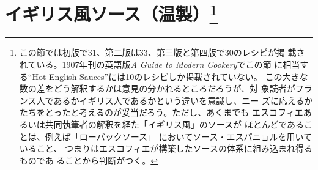 \hypertarget{ux30a4ux30aeux30eaux30b9ux98a8ux30bdux30fcux30b9ux6e29ux88fd24}{%
\section[イギリス風ソース（温製）]{\texorpdfstring{イギリス風ソース（温製）\footnote{この節では初版で31、第二版は33、第三版と第四版で30のレシピが掲
  載されている。1907年刊の英語版\emph{A Guide to Modern Cookery}でこの節
  に相当する``Hot English Sauces''には10のレシピしか掲載されていない。
  この大きな数の差をどう解釈するかは意見の分かれるところだろうが、対
  象読者がフランス人であるかイギリス人であるかという違いを意識し、ニー
  ズに応えるかたちをとったと考えるのが妥当だろう。ただし、あくまでも
  エスコフィエあるいは共同執筆者の解釈を経た「イギリス風」のソースが
  ほとんどであることは、例えば「\protect\hyperlink{roe-buck-sauce}{ローバックソース}」
  において\protect\hyperlink{sauce-espagnole}{ソース・エスパニョル}を用いていること、
  つまりはエスコフィエが構築したソースの体系に組み込まれ得るものであ
  ることから判断がつく。}}{イギリス風ソース（温製）}}\label{ux30a4ux30aeux30eaux30b9ux98a8ux30bdux30fcux30b9ux6e29ux88fd24}}


